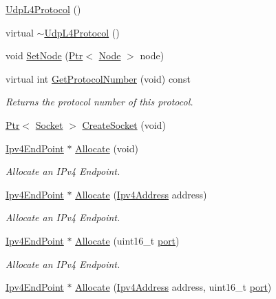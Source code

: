 \begin{DoxyCompactItemize}
\item 
\hyperlink{classns3_1_1UdpL4Protocol_a8208dcb98f8b78643e8eaa3c461e85b8}{Udp\+L4\+Protocol} ()
\item 
virtual \hyperlink{classns3_1_1UdpL4Protocol_a8f0b51d9b63e3433d77f86d0be7d8a7a}{$\sim$\+Udp\+L4\+Protocol} ()
\item 
void \hyperlink{classns3_1_1UdpL4Protocol_a495a632be9c6bdef5d6312496b05c1a8}{Set\+Node} (\hyperlink{classns3_1_1Ptr}{Ptr}$<$ \hyperlink{classns3_1_1Node}{Node} $>$ node)
\item 
virtual int \hyperlink{classns3_1_1UdpL4Protocol_a6773cc5c80c28564fff980a54c9e118f}{Get\+Protocol\+Number} (void) const 
\begin{DoxyCompactList}\small\item\em Returns the protocol number of this protocol. \end{DoxyCompactList}\item 
\hyperlink{classns3_1_1Ptr}{Ptr}$<$ \hyperlink{classns3_1_1Socket}{Socket} $>$ \hyperlink{classns3_1_1UdpL4Protocol_a7113e52080215055f21bea3d4d87e8e4}{Create\+Socket} (void)
\item 
\hyperlink{classns3_1_1Ipv4EndPoint}{Ipv4\+End\+Point} $\ast$ \hyperlink{classns3_1_1UdpL4Protocol_a6d5d490b0841eaf685ddebcbe34ecb4b}{Allocate} (void)
\begin{DoxyCompactList}\small\item\em Allocate an I\+Pv4 Endpoint. \end{DoxyCompactList}\item 
\hyperlink{classns3_1_1Ipv4EndPoint}{Ipv4\+End\+Point} $\ast$ \hyperlink{classns3_1_1UdpL4Protocol_a5fb8e5391b1553bcd99673745a9e1475}{Allocate} (\hyperlink{classns3_1_1Ipv4Address}{Ipv4\+Address} address)
\begin{DoxyCompactList}\small\item\em Allocate an I\+Pv4 Endpoint. \end{DoxyCompactList}\item 
\hyperlink{classns3_1_1Ipv4EndPoint}{Ipv4\+End\+Point} $\ast$ \hyperlink{classns3_1_1UdpL4Protocol_a1c8b020766736a65e25087d5c8b80b75}{Allocate} (uint16\+\_\+t \hyperlink{visualizer-ideas_8txt_a21ff1c530daf8435e00048b7fc2c58e3}{port})
\begin{DoxyCompactList}\small\item\em Allocate an I\+Pv4 Endpoint. \end{DoxyCompactList}\item 
\hyperlink{classns3_1_1Ipv4EndPoint}{Ipv4\+End\+Point} $\ast$ \hyperlink{classns3_1_1UdpL4Protocol_a96429001ce7a4da4ae1ad5a688fc489e}{Allocate} (\hyperlink{classns3_1_1Ipv4Address}{Ipv4\+Address} address, uint16\+\_\+t \hyperlink{visualizer-ideas_8txt_a21ff1c530daf8435e00048b7fc2c58e3}{port})

\end{DoxyCompactItemize}
